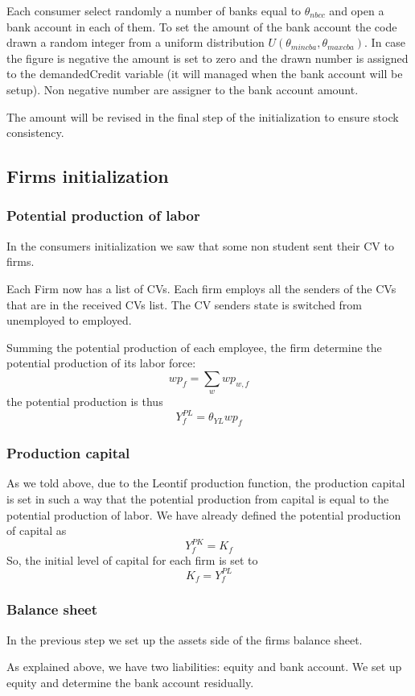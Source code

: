 \documentclass{book}
\begin{document}
\vskip5mm

Each consumer select randomly a number of banks equal to $\theta_{nbcc}$ and open a bank account in each of them. To set the amount of the bank account the code drawn a random integer from a uniform distribution $U(\theta_{mincba},\theta_{maxcba})$. In case the figure is negative the amount is set to zero and the drawn number is assigned to the demandedCredit variable (it will managed when the bank account will be setup). Non negative number are assigner to the bank account amount.

The amount will be revised in the final step of the initialization to ensure stock consistency.

\subsection{Firms initialization}
\subsubsection{Potential production of labor}
In the consumers initialization we saw that some non student sent their CV to firms.

Each Firm now has a list of CVs. Each firm employs all the senders of the CVs that are in the received CVs list. The CV senders state is switched from unemployed to employed.

Summing the potential production of each employee, the firm determine the potential production of its labor force:
\[
	wp_f=\sum_{w}wp_{w,f}
\]
the potential production is thus
\[
	Y^{PL}_f=\theta_{YL}wp_f
\]

\subsubsection{Production capital}
As we told above, due to the Leontif production function, the production capital is set in such a way that the potential production from capital is equal to the potential production of labor. We have already defined the potential production of capital as
\[Y_f^{PK}=K_f\]
So, the initial level of capital for each firm is set to
\[
K_f=Y^{PL}_f
\]
\subsubsection{Balance sheet}

In the previous step we set up the assets side of the firms balance sheet.

As explained above, we have two liabilities: equity and bank account. We set up equity and determine the bank account residually.
\end{document}

